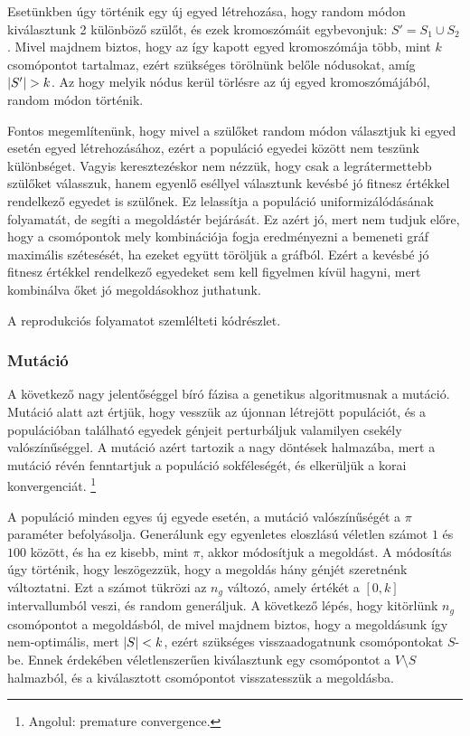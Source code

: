 Esetünkben úgy történik egy új egyed létrehozása, hogy random módon kiválasztunk 2 különböző szülőt,
és ezek kromoszómáit egybevonjuk: $S' = S_{1} \cup S_{2}$.
Mivel majdnem biztos, hogy az így kapott egyed kromoszómája több, mint $k$ csomópontot tartalmaz,
ezért szükséges törölnünk belőle nódusokat, amíg $\lvert S'\rvert > k$.
Az hogy melyik nódus kerül törlésre az új egyed kromoszómájából, random módon történik.

Fontos megemlítenünk, hogy mivel a szülőket random módon választjuk ki  egyed esetén egyed létrehozásához,
ezért a populáció egyedei között nem teszünk különbséget.
Vagyis keresztezéskor nem nézzük, hogy csak a legrátermettebb szülőket válasszuk,
hanem egyenlő eséllyel választunk kevésbé jó fitnesz értékkel rendelkező egyedet is szülőnek.
Ez lelassítja a populáció uniformizálódásának folyamatát, de segíti a megoldástér bejárását.
Ez azért jó, mert nem tudjuk előre, hogy a csomópontok mely kombinációja
fogja eredményezni a bemeneti gráf maximális szétesését, ha ezeket együtt töröljük a gráfból.
Ezért a kevésbé jó fitnesz értékkel rendelkező egyedeket sem kell figyelmen kívül hagyni,
mert kombinálva őket jó megoldásokhoz juthatunk.

A reprodukciós folyamatot szemlélteti  kódrészlet.



\subsubsection{Mutáció}
A következő nagy jelentőséggel bíró fázisa a genetikus algoritmusnak a mutáció.
Mutáció alatt azt értjük, hogy vesszük az újonnan létrejött populációt,
és a populációban található egyedek génjeit perturbáljuk valamilyen csekély valószínűséggel.
A mutáció azért tartozik a nagy döntések halmazába,
mert a mutáció révén fenntartjuk a populáció sokféleségét, és elkerüljük a korai konvergenciát.
\footnote{
  Angolul: premature convergence.
}

A populáció minden egyes új egyede esetén, a mutáció valószínűségét a $\pi$ paraméter befolyásolja.
Generálunk egy egyenletes eloszlású véletlen számot $1$ és $100$ között, és ha ez kisebb, mint $\pi$, akkor módosítjuk a megoldást.
A módosítás úgy történik, hogy leszögezzük, hogy a megoldás hány génjét szeretnénk változtatni.
Ezt a számot tükrözi az $n_{g}$ változó, amely értékét a $\left[0, k\right]$ intervallumból veszi, és random generáljuk.
A következő lépés, hogy kitörlünk $n_{g}$ csomópontot a megoldásból, de mivel majdnem biztos,
hogy a megoldásunk így nem-optimális, mert $\lvert S\rvert < k$, ezért szükséges visszaadogatnunk csomópontokat $S$-be.
Ennek érdekében véletlenszerűen kiválasztunk egy csomópontot a $V \setminus S$ halmazból,
és a kiválasztott csomópontot visszatesszük a megoldásba.


